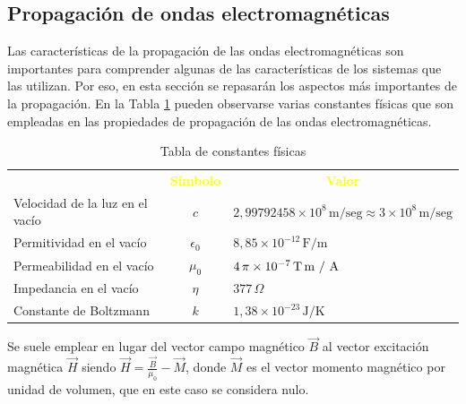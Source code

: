 \subsection{Propagaci\'on de ondas electromagn\'eticas}

Las caracter\'isticas de la propagaci\'on de las ondas electromagn\'eticas son importantes para comprender algunas de las caracter\'isticas de los sistemas que las utilizan. Por eso, en esta secci\'on se repasar\'an los aspectos m\'as importantes de la propagaci\'on. En la Tabla \ref{tab:06.constantes.fisicas} pueden observarse varias constantes f\'isicas que son empleadas en las propiedades de propagaci\'on de las ondas electromagn\'eticas.


\begin{table}[!h]
  \centering
  \caption{Tabla de constantes f\'isicas}
  \begin{tabular}{lcl}  \rowcolor{blue!50!black}
    \multicolumn{1}{c}{\textcolor{yellow}{\bf Constante}}
&   \multicolumn{1}{c}{\textcolor{yellow}{\bf S\'imbolo}}
&   \multicolumn{1}{c}{\textcolor{yellow}{\bf Valor}} \\

Velocidad de la luz en el vac\'io & $c$ & $2,99792458 \times 10^8\,\text{m/seg} \approx 3 \times 10^8\,\text{m/seg}$ \\ \hline
Permitividad en el vac\'io & $\epsilon_0$ & $8,85 \times 10^{-12} \,\text{F/m}$ \\ \hline
Permeabilidad en el vac\'io & $\mu_0$ & $ 4\,\pi \times 10^{-7} \,\text{T\,m / A}$ \\ \hline
Impedancia en el vac\'io & $\eta$ & $ 377\,\Omega$ \\ \hline
Constante de Boltzmann & $k$ &  $1,38 \times 10^{-23} \,\text{J/K}$ \\ \hline
  \end{tabular}

  \label{tab:06.constantes.fisicas}
\end{table}


Se suele emplear en lugar del vector campo magn\'etico  $\vec{B}$ al vector excitaci\'on magn\'etica $\vec{H}$ siendo 
$\displaystyle \vec{H} = \frac{\vec{B}}{\mu_0} - \vec{M}$,
donde $\vec{M}$ es el vector momento magn\'etico por unidad de volumen, que en este caso se considera nulo.


